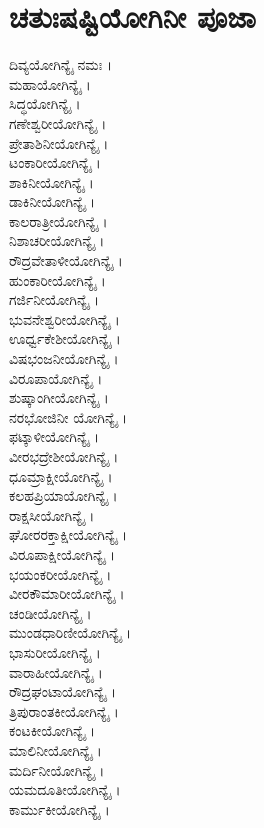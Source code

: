\section{ಚತುಃಷಷ್ಟಿಯೋಗಿನೀ ಪೂಜಾ}
\begin{multicols}{2} 
ದಿವ್ಯಯೋಗಿನ್ಯೈ ನಮಃ ।\\
ಮಹಾಯೋಗಿನ್ಯೈ ।\\
ಸಿದ್ಧಯೋಗಿನ್ಯೈ ।\\
ಗಣೇಶ್ವರೀಯೋಗಿನ್ಯೈ ।\\
ಪ್ರೇತಾಶಿನೀಯೋಗಿನ್ಯೈ ।\\
ಟಂಕಾರೀಯೋಗಿನ್ಯೈ ।\\
ಶಾಕಿನೀಯೋಗಿನ್ಯೈ ।\\
ಡಾಕಿನೀಯೋಗಿನ್ಯೈ ।\\
ಕಾಲರಾತ್ರೀಯೋಗಿನ್ಯೈ ।\\
ನಿಶಾಚರೀಯೋಗಿನ್ಯೈ ।\\
ರೌದ್ರವೇತಾಳೀಯೋಗಿನ್ಯೈ ।\\
ಹುಂಕಾರೀಯೋಗಿನ್ಯೈ ।\\
ಗರ್ಜಿನೀಯೋಗಿನ್ಯೈ ।\\
ಭುವನೇಶ್ವರೀಯೋಗಿನ್ಯೈ ।\\
ಊರ್ಧ್ವಕೇಶೀಯೋಗಿನ್ಯೈ ।\\
ವಿಷಭಂಜನೀಯೋಗಿನ್ಯೈ ।\\
ವಿರೂಪಾಯೋಗಿನ್ಯೈ ।\\
ಶುಷ್ಕಾಂಗೀಯೋಗಿನ್ಯೈ ।\\
ನರಭೋಜಿನೀ ಯೋಗಿನ್ಯೈ ।\\
ಫಟ್ಕಾಳೀಯೋಗಿನ್ಯೈ ।\\
ವೀರಭದ್ರೇಶೀಯೋಗಿನ್ಯೈ ।\\
ಧೂಮ್ರಾಕ್ಷೀಯೋಗಿನ್ಯೈ ।\\
ಕಲಹಪ್ರಿಯಾಯೋಗಿನ್ಯೈ ।\\
ರಾಕ್ಷಸೀಯೋಗಿನ್ಯೈ ।\\
ಘೋರರಕ್ತಾಕ್ಷೀಯೋಗಿನ್ಯೈ ।\\
ವಿರೂಪಾಕ್ಷೀಯೋಗಿನ್ಯೈ ।\\
ಭಯಂಕರೀಯೋಗಿನ್ಯೈ ।\\
ವೀರಕೌಮಾರೀಯೋಗಿನ್ಯೈ ।\\
ಚಂಡೀಯೋಗಿನ್ಯೈ ।\\
ಮುಂಡಧಾರಿಣೀಯೋಗಿನ್ಯೈ ।\\
ಭಾಸುರೀಯೋಗಿನ್ಯೈ ।\\
ವಾರಾಹೀಯೋಗಿನ್ಯೈ ।\\
ರೌದ್ರಘಂಟಾಯೋಗಿನ್ಯೈ ।\\
ತ್ರಿಪುರಾಂತಕೀಯೋಗಿನ್ಯೈ ।\\
ಕಂಟಕೀಯೋಗಿನ್ಯೈ ।\\
ಮಾಲಿನೀಯೋಗಿನ್ಯೈ ।\\
ಮರ್ದಿನೀಯೋಗಿನ್ಯೈ ।\\
ಯಮದೂತೀಯೋಗಿನ್ಯೈ ।\\
ಕಾರ್ಮುಕೀಯೋಗಿನ್ಯೈ ।\\

\end{multicols}
